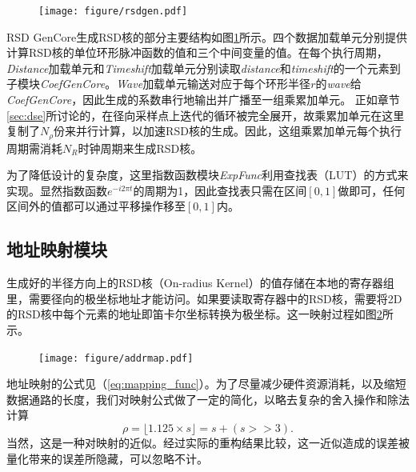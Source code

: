 \documentclass[master]{shtthesis}             %
\begin{document}
\begin{figure}[!tb]
    \centering
    \texttt{[image: figure/rsdgen.pdf]}
    \label{fig:rkg}
\end{figure}

RSD GenCore生成RSD核的部分主要结构如图\ref{fig:rkg}所示。四个数据加载单元分别提供计算RSD核的单位环形脉冲函数的值和三个中间变量的值。在每个执行周期，\textit{Distance}加载单元和\textit{Timeshift}加载单元分别读取\textit{distance}和\textit{timeshift}的一个元素到子模块\textit{CoefGenCore}。\textit{Wave}加载单元输送对应于每个环形半径$r$的\textit{wave}给\textit{CoefGenCore}，因此生成的系数串行地输出并广播至一组乘累加单元。
正如章节\ref{sec:dse}所讨论的，在径向采样点上迭代的循环被完全展开，故乘累加单元在这里复制了$N_\rho$份来并行计算，以加速RSD核的生成。因此，这组乘累加单元每个执行周期需消耗$N_R$时钟周期来生成RSD核。

为了降低设计的复杂度，这里指数函数模块\textit{ExpFunc}利用查找表（LUT）的方式来实现。显然指数函数$e^{-i2\pi t}$的周期为1，因此查找表只需在区间$[0,1]$做即可，任何区间外的值都可以通过平移操作移至$[0,1]$内。

\subsection{地址映射模块}

生成好的半径方向上的RSD核（On-radius Kernel）的值存储在本地的寄存器组里，需要径向的极坐标地址才能访问。如果要读取寄存器中的RSD核，需要将2D的RSD核中每个元素的地址即笛卡尔坐标转换为极坐标。这一映射过程如图\ref{fig:addrmap}所示。
\begin{figure}[!tb]
    \centering
    \texttt{[image: figure/addrmap.pdf]}
    \label{fig:addrmap}
\end{figure}
地址映射的公式见（\ref{eq:mapping_func}）。为了尽量减少硬件资源消耗，以及缩短数据通路的长度，我们对映射公式做了一定的简化，以略去复杂的舍入操作和除法计算
\begin{equation}
  \rho = \lfloor 1.125 \times s\rfloor = s + (s >> 3).
\end{equation}
当然，这是一种对映射的近似。经过实际的重构结果比较，这一近似造成的误差被量化带来的误差所隐藏，可以忽略不计。
\end{document}
